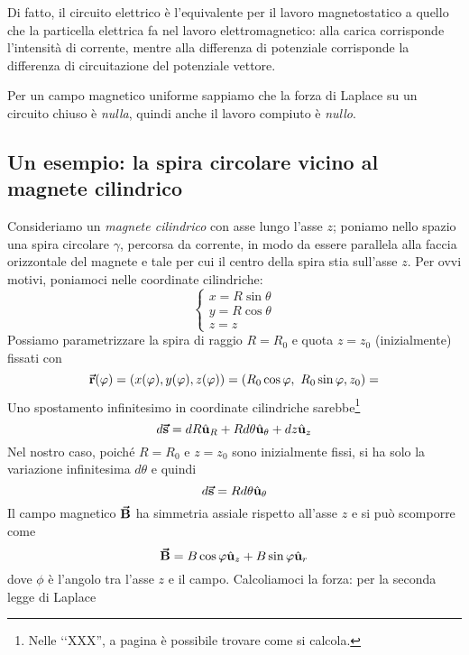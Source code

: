 Di fatto, il circuito elettrico è l'equivalente per il lavoro magnetostatico a quello che la particella elettrica fa nel lavoro elettromagnetico: alla carica corrisponde l'intensità di corrente, mentre alla differenza di potenziale corrisponde la differenza di circuitazione del potenziale vettore.

Per un campo magnetico uniforme sappiamo che la forza di Laplace su un circuito chiuso è \textit{nulla}, quindi anche il lavoro compiuto è \textit{nullo}.
\subsection{Un esempio: la spira circolare vicino al magnete cilindrico}
Consideriamo un \textit{magnete cilindrico} con asse lungo l'asse $z$; poniamo nello spazio una spira circolare $\gamma$, percorsa da corrente, in modo da essere parallela alla faccia orizzontale del magnete e tale per cui il centro della spira stia sull'asse $z$.
Per ovvi motivi, poniamoci nelle coordinate cilindriche:
\begin{equation*}
	\begin{cases}
		x=R\sin\theta\\
		y=R\cos\theta\\
		z=z
	\end{cases}
\end{equation*}
Possiamo parametrizzare la spira di raggio $R=R_0$ e quota $z=z_0$ (inizialmente) fissati con
\begin{equation*}
	\vba{r}(\phi)=\left(x(\phi),y(\phi),z(\phi)\right)=\left(R_0\cos\phi,\ R_0\sin\phi, z_0\right)=
\end{equation*}
Uno spostamento infinitesimo in coordinate cilindriche sarebbe\footnote{	Nelle ‘‘XXX'', a pagina \pageref{spinfinitesimocilindriche} è possibile trovare come si calcola.}
\begin{equation}
	d\vb*{\va{s}}=dR\hat{\mathbf{u}}_R+Rd\theta\hat{\mathbf{u}}_\theta+dz\hat{\mathbf{u}}_z
\end{equation}
Nel nostro caso, poiché $R=R_0$ e $z=z_0$ sono inizialmente fissi, si ha solo la variazione infinitesima $d\theta$ e quindi
\begin{equation}
	d\vb*{\va{s}}=Rd\theta\hat{\mathbf{u}}_\theta
\end{equation}
Il campo magnetico $\vb*{\va{B}}$ ha simmetria assiale rispetto all'asse $z$ e si può scomporre come
\begin{equation}
	\vb*{\va{B}}=B\cos\varphi\hat{\mathbf{u}}_z+B\sin\varphi\hat{\mathbf{u}}_r
\end{equation}
dove $\phi$ è l'angolo tra l'asse $z$ e il campo. Calcoliamoci la forza: per la seconda legge di Laplace
